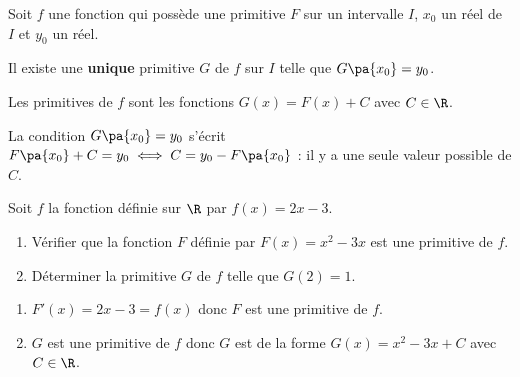 \begin{prop}
	Soit $f$ une fonction qui possède une primitive $F$ sur un intervalle $I$, $x_0$ un réel de $I$ et $y_0$ un réel.

	Il existe une \textbf{unique} primitive $G$ de $f$ sur $I$ telle que $G\pa{x_0} = y_0$.
\end{prop}

\begin{demo}
	Les primitives de $f$ sont les fonctions $G(x) = F(x) + C$ avec $C \in \R$.

	La condition $G\pa{x_0} = y_0$ s'écrit $F\pa{x_0} + C = y_0\iff C = y_0 - F\pa{x_0}$ : il y a une seule valeur possible de $C$.
\end{demo}

\begin{methode}
	Soit $f$ la fonction définie sur $\R$ par $f(x) = 2x - 3$.

	\begin{enumerate}
		\item Vérifier que la fonction $F$ définie par $F(x) = x^2 - 3x$ est une primitive de $f$.
		\item Déterminer la primitive $G$ de $f$ telle que $G(2) = 1$.
	\end{enumerate}

	\begin{correction}
		\nline
		\begin{enumerate}
			\item $F'(x) = 2x - 3 = f(x)$ donc $F$ est une primitive de $f$.
			\item $G$ est une primitive de $f$ donc $G$ est de la forme $G(x) = x^2 - 3x + C$ avec $C \in \R$.


\end{enumerate}
\end{correction}
\end{methode}
